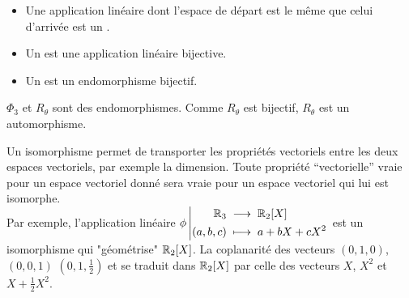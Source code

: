 \documentclass{book}
\begin{document}
\begin{Definition}[Endomorphisme]
\begin{itemize}
\item
  Une application linéaire dont l'espace de départ est le même que celui d'arrivée est un .
\item
  Un  est une application linéaire bijective.
\item
  Un  est un endomorphisme bijectif.
\end{itemize}
\end{Definition}
\begin{Exemple}
$\Phi _3$ et $R_\theta$ sont des endomorphismes. Comme $R_\theta$ est bijectif, $R_\theta$ est un automorphisme. 
\end{Exemple}
\begin{Texte}
Un isomorphisme permet de transporter les propriétés vectoriels entre les deux espaces vectoriels, par exemple la dimension.  Toute propriété ``vectorielle'' vraie pour un espace vectoriel donné sera vraie pour un espace vectoriel qui lui est isomorphe. \\
Par exemple, l'application linéaire ${\phi}\left|\begin{aligned}{\mathbb{R}_3}&\;\longrightarrow\;{\mathbb{R}_2[X]}\\{(a,b,c)}&\;\longmapsto\;{a + bX + cX^2}\end{aligned}\right.$ est un isomorphisme qui "géométrise" $\mathbb{R} _2[X]$.
La coplanarité des vecteurs $(0, 1, 0)$, $(0, 0, 1)$ $(0, 1, \frac 1 2)$ et  se traduit dans $\mathbb{R}_2[X]$ par celle des vecteurs $X$, $X^2$ et $X +\frac 1 2  X^2$.
\begin{center}
\begin{Figure}
\end{Figure}
\end{center}
\end{Texte}
\end{document}
